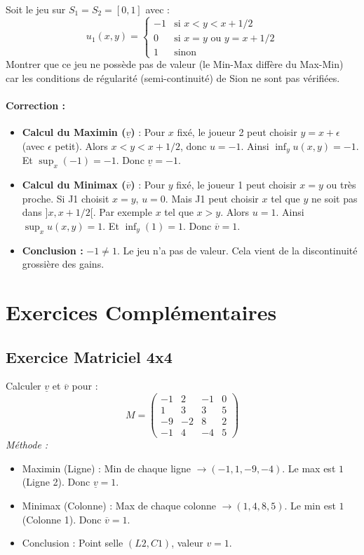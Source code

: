 \begin{exercice}
Soit le jeu sur $S_1 = S_2 = [0,1]$ avec :
$$u_1(x,y) = \begin{cases} -1 & \text{si } x < y < x + 1/2 \\ 0 & \text{si } x = y \text{ ou } y = x + 1/2 \\ 1 & \text{sinon} \end{cases}$$
Montrer que ce jeu ne possède pas de valeur (le Min-Max diffère du Max-Min) car les conditions de régularité (semi-continuité) de Sion ne sont pas vérifiées.
\end{exercice}

\paragraph{Correction :}
\begin{itemize}
    \item \textbf{Calcul du Maximin ($\underline{v}$)} :
    Pour $x$ fixé, le joueur 2 peut choisir $y=x + \epsilon$ (avec $\epsilon$ petit). Alors $x < y < x+1/2$, donc $u=-1$.
    Ainsi $\inf_y u(x,y) = -1$.
    Et $\sup_x (-1) = -1$. Donc $\underline{v} = -1$.
    
    \item \textbf{Calcul du Minimax ($\overline{v}$)} :
    Pour $y$ fixé, le joueur 1 peut choisir $x = y$ ou très proche.
    Si J1 choisit $x=y$, $u=0$.
    Mais J1 peut choisir $x$ tel que $y$ ne soit pas dans $]x, x+1/2[$. Par exemple $x$ tel que $x > y$. Alors $u=1$.
    Ainsi $\sup_x u(x,y) = 1$.
    Et $\inf_y (1) = 1$. Donc $\overline{v} = 1$.
    
    \item \textbf{Conclusion :} $-1 \ne 1$. Le jeu n'a pas de valeur. Cela vient de la discontinuité grossière des gains.
\end{itemize}

\section{Exercices Complémentaires}

\subsection{Exercice Matriciel 4x4}
Calculer $\underline{v}$ et $\overline{v}$ pour :
$$M = \begin{pmatrix} -1 & 2 & -1 & 0 \\ 1 & 3 & 3 & 5 \\ -9 & -2 & 8 & 2 \\ -1 & 4 & -4 & 5 \end{pmatrix}$$
\textit{Méthode :}
\begin{itemize}
    \item Maximin (Ligne) : Min de chaque ligne $\to (-1, 1, -9, -4)$. Le max est $1$ (Ligne 2). Donc $\underline{v} = 1$.
    \item Minimax (Colonne) : Max de chaque colonne $\to (1, 4, 8, 5)$. Le min est $1$ (Colonne 1). Donc $\overline{v} = 1$.
    \item Conclusion : Point selle $(L2, C1)$, valeur $v=1$.
\end{itemize}

